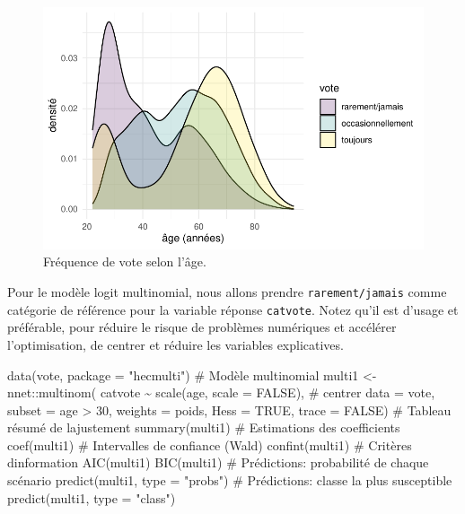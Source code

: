 \documentclass[
  11pt,
  letterpaper,
]{scrbook}
\newenvironment{Shaded}{\begin{snugshade}}{\end{snugshade}}
\newcommand{\AttributeTok}[1]{\textcolor[rgb]{0.40,0.45,0.13}{#1}}
\newcommand{\CommentTok}[1]{\textcolor[rgb]{0.37,0.37,0.37}{#1}}
\newcommand{\ConstantTok}[1]{\textcolor[rgb]{0.56,0.35,0.01}{#1}}
\newcommand{\DecValTok}[1]{\textcolor[rgb]{0.68,0.00,0.00}{#1}}
\newcommand{\FunctionTok}[1]{\textcolor[rgb]{0.28,0.35,0.67}{#1}}
\newcommand{\NormalTok}[1]{\textcolor[rgb]{0.00,0.23,0.31}{#1}}
\newcommand{\OtherTok}[1]{\textcolor[rgb]{0.00,0.23,0.31}{#1}}
\newcommand{\SpecialCharTok}[1]{\textcolor[rgb]{0.37,0.37,0.37}{#1}}
\newcommand{\StringTok}[1]{\textcolor[rgb]{0.13,0.47,0.30}{#1}}
\theoremstyle{definition}
\theoremstyle{remark}
\begin{document}
\begin{figure}[ht!]

{\centering \includegraphics{reglogistique_files/figure-pdf/fig-vote-age-1.pdf}

}

\caption{\label{fig-vote-age}Fréquence de vote selon l'âge.}

\end{figure}

Pour le modèle logit multinomial, nous allons prendre
\texttt{rarement/jamais} comme catégorie de référence pour la variable
réponse \texttt{catvote}. Notez qu'il est d'usage et préférable, pour
réduire le risque de problèmes numériques et accélérer l'optimisation,
de centrer et réduire les variables explicatives.

\begin{Shaded}
\begin{Highlighting}[]
\FunctionTok{data}\NormalTok{(vote, }\AttributeTok{package =} \StringTok{"hecmulti"}\NormalTok{)}
\CommentTok{\# Modèle multinomial}
\NormalTok{multi1 }\OtherTok{\textless{}{-}}\NormalTok{ nnet}\SpecialCharTok{::}\FunctionTok{multinom}\NormalTok{(}
\NormalTok{  catvote }\SpecialCharTok{\textasciitilde{}} \FunctionTok{scale}\NormalTok{(age, }\AttributeTok{scale =} \ConstantTok{FALSE}\NormalTok{), }\CommentTok{\# centrer}
  \AttributeTok{data =}\NormalTok{ vote, }
  \AttributeTok{subset =}\NormalTok{ age }\SpecialCharTok{\textgreater{}} \DecValTok{30}\NormalTok{,}
  \AttributeTok{weights =}\NormalTok{ poids,}
  \AttributeTok{Hess =} \ConstantTok{TRUE}\NormalTok{,}
  \AttributeTok{trace =} \ConstantTok{FALSE}\NormalTok{) }
\CommentTok{\# Tableau résumé de l\textquotesingle{}ajustement}
\FunctionTok{summary}\NormalTok{(multi1)}
\CommentTok{\# Estimations des coefficients}
\FunctionTok{coef}\NormalTok{(multi1)}
\CommentTok{\# Intervalles de confiance (Wald)}
\FunctionTok{confint}\NormalTok{(multi1)}
\CommentTok{\# Critères d\textquotesingle{}information}
\FunctionTok{AIC}\NormalTok{(multi1)}
\FunctionTok{BIC}\NormalTok{(multi1)}
\CommentTok{\# Prédictions: probabilité de chaque scénario}
\FunctionTok{predict}\NormalTok{(multi1, }\AttributeTok{type =} \StringTok{"probs"}\NormalTok{)}
\CommentTok{\# Prédictions: classe la plus susceptible}
\FunctionTok{predict}\NormalTok{(multi1, }\AttributeTok{type =} \StringTok{"class"}\NormalTok{)}
\end{Highlighting}
\end{Shaded}
\end{document}
